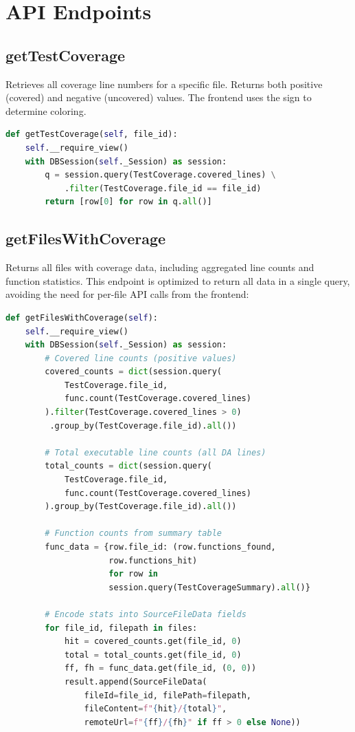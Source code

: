 \section{API Endpoints}

\subsection{getTestCoverage}

Retrieves all coverage line numbers for a specific file. Returns both positive (covered) and negative (uncovered) values. The frontend uses the sign to determine coloring.

\begin{lstlisting}[language=Python, caption={getTestCoverage API implementation}]
def getTestCoverage(self, file_id):
    self.__require_view()
    with DBSession(self._Session) as session:
        q = session.query(TestCoverage.covered_lines) \
            .filter(TestCoverage.file_id == file_id)
        return [row[0] for row in q.all()]
\end{lstlisting}

\subsection{getFilesWithCoverage}

Returns all files with coverage data, including aggregated line counts and function statistics. This endpoint is optimized to return all data in a single query, avoiding the need for per-file API calls from the frontend:

\begin{lstlisting}[language=Python, caption={getFilesWithCoverage---single-query optimization}]
def getFilesWithCoverage(self):
    self.__require_view()
    with DBSession(self._Session) as session:
        # Covered line counts (positive values)
        covered_counts = dict(session.query(
            TestCoverage.file_id,
            func.count(TestCoverage.covered_lines)
        ).filter(TestCoverage.covered_lines > 0)
         .group_by(TestCoverage.file_id).all())

        # Total executable line counts (all DA lines)
        total_counts = dict(session.query(
            TestCoverage.file_id,
            func.count(TestCoverage.covered_lines)
        ).group_by(TestCoverage.file_id).all())

        # Function counts from summary table
        func_data = {row.file_id: (row.functions_found,
                     row.functions_hit)
                     for row in
                     session.query(TestCoverageSummary).all()}

        # Encode stats into SourceFileData fields
        for file_id, filepath in files:
            hit = covered_counts.get(file_id, 0)
            total = total_counts.get(file_id, 0)
            ff, fh = func_data.get(file_id, (0, 0))
            result.append(SourceFileData(
                fileId=file_id, filePath=filepath,
                fileContent=f"{hit}/{total}",
                remoteUrl=f"{ff}/{fh}" if ff > 0 else None))
\end{lstlisting}

